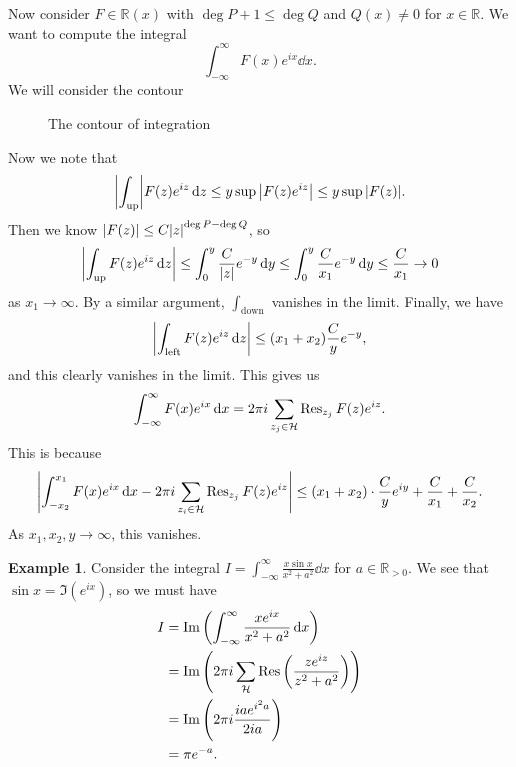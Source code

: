 \documentclass[leqno, openany]{memoir}
\theoremstyle{definition}
\newtheorem{exm}[thm]{Example}
\theoremstyle{remark}
\theoremstyle{plain}
\theoremstyle{definition}
\theoremstyle{remark}
\newcommand{\R}{\mathbb{R}}
\newcommand{\mc}[1]{\mathcal{#1}}
\begin{document}
Now consider $F \in \R(x)$ with $\deg P + 1 \leq \deg Q$ and $Q(x) \neq 0$ for $x \in \R$. We want to compute the integral
\[ \int_{- \infty}^{\infty} F(x) e^{ix} \dd{x}. \]
We will consider the contour
\begin{figure}[H]
\begin{center}
\end{center}
\caption{The contour of integration}%
\label{fig:contour-integration}
\end{figure}

Now we note that 
\[ \abs{\int_{\text{up}}} F(z) e^{iz} \dd{z} \leq y \sup \abs{F(z) e^{iz}} \leq y \sup \abs{F(z)}. \]
Then we know $\abs{F(z)} \leq C \abs{z}^{\deg P - \deg Q}$, so
\[ \abs{\int_{\text{up}} F(z) e^{iz} \dd{z}} \leq \int_0^y \frac{C}{\abs{z}} e^{-y} \dd{y} \leq \int_0^y \frac{C}{x_1} e^{-y} \dd{y} \leq \frac{C}{x_1} \to 0 \]
as $x_1 \to \infty$. By a similar argument, $\int_{\text{down}}$ vanishes in the limit. Finally, we have
\[ \abs{\int_{\text{left}} F(z) e^{iz} \dd{z}} \leq (x_1 + x_2) \frac{C}{y} e^{-y}, \]
and this clearly vanishes in the limit. This gives us
\[ \int_{- \infty}^{\infty} F(x) e^{ix} \dd{x} = 2 \pi i \sum_{{z_j \in \mc{H}}} \Res_{z_j} F(z) e^{iz}. \]
This is because 
\[ \abs{\int_{-x_2}^{x_1} F(x) e^{ix} \dd{x} - 2 \pi i \sum_{z_i \in \mc{H}} \Res_{z_j} F(z)e^{iz}} \leq (x_1 + x_2) \cdot \frac{C}{y}e^{iy} + \frac{C}{x_1} + \frac{C}{x_2}. \]
As $x_1, x_2, y \to \infty$, this vanishes.

\begin{exm}
    Consider the integral $I = \int_{- \infty}^{\infty} \frac{x \sin x}{x^2 + a^2} \dd{x}$ for $a \in \R_{>0}$. We see that $\sin x = \Im(e^{ix})$, so we must have
    \begin{align*}
        I &= \Im\qty(\int_{-\infty}^{\infty} \frac{xe^{ix}}{x^2+a^2} \dd{x}) \\
          &= \Im \qty(2 \pi i \sum_{\mc{H}} \Res \qty(\frac{ze^{iz}}{z^2 + a^2})) \\
          &= \Im\qty(2 \pi i \frac{ia e^{i^2a}}{2ia}) \\
          &= \pi e^{-a}.
    \end{align*}
\end{exm}
\end{document}
